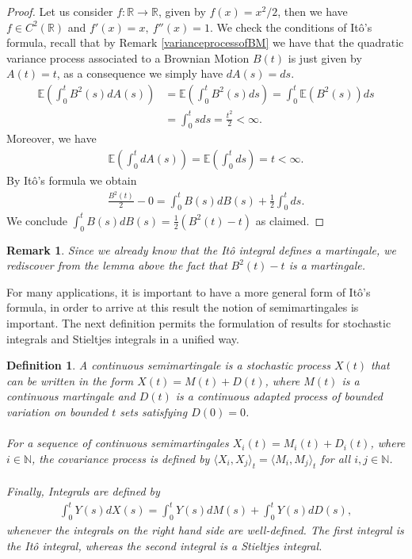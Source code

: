 \documentclass[11pt,a4paper, final]{article}
\newtheorem{defn}{Definition}[section]
\newtheorem{rem}{Remark}[defn]
\begin{document}
\begin{proof}
Let us consider $f: \mathbb{R} \to \mathbb{R}$, given by $f(x) = x^2/2$, then we have $f \in C^2( \mathbb{R})$ and $f'(x)=x, \ f''(x) = 1$. We check the conditions of Itô's formula, recall that by Remark \ref{varianceprocessofBM} we have that the quadratic variance process associated to a Brownian Motion $B(t)$ is just given by $A(t)=t$, as a consequence we simply have $dA(s)=ds$. 
\begin{align*}
\mathbb{E} \left( \int_0^t B^2(s) dA(s) \right) &= \mathbb{E} \left( \int_0^t B^2(s) ds \right) = \int_0^t \mathbb{E}(B^2(s) ) ds \\ &  = \int_0^t s ds = \frac{t^2}{2} < \infty.
\end{align*} 
Moreover, we have
\begin{align*}
\mathbb{E} \left( \int_0^t dA(s) \right) = \mathbb{E}\left( \int_0^t ds \right) = t < \infty. 
\end{align*}
By Itô's formula we obtain
\begin{align*}
\frac{B^2(t)}{2}- 0 = \int_0^t B(s) dB(s) + \frac{1}{2} \int_0^t ds.
\end{align*}
We conclude $\displaystyle \int_0^t B(s) dB(s) = \frac{1}{2}(B^2(t)-t)$ as claimed. 
\end{proof}
\begin{rem} Since we already know that the Itô integral defines a martingale, we rediscover from the lemma above the fact that $B^2(t)-t$ is a martingale. 
\end{rem}
\newpage
\noindent For many applications, it is important to have a more general form of Itô's formula, in order to arrive at this result the notion of semimartingales is important. The next definition permits the formulation of results for stochastic integrals and Stieltjes integrals in a unified way. 
\begin{defn} \label{defsemimartingale} A continuous semimartingale is a stochastic process $X(t)$ that can be written in the form $X(t)=M(t) + D(t)$, where $M(t)$ is a continuous martingale and $D(t)$ is a continuous adapted process of bounded variation on bounded $t$ sets satisfying $D(0)=0$. 
\\\\
For a sequence of continuous semimartingales $X_i(t)= M_i(t) + D_i(t)$, where $i \in \mathbb{N}$, the covariance process is defined by $\langle X_i, X_j \rangle_t = \langle M_i, M_j \rangle_t$ for all $i,j \in \mathbb{N}$. 
\\\\
Finally, Integrals are defined by 
\begin{align*}
\int_0^t Y(s) dX(s) = \int_0^t Y(s) dM(s) + \int_0^t Y(s) dD(s),
\end{align*}
whenever the integrals on the right hand side are well-defined. The first integral is the Itô integral, whereas the second integral is a Stieltjes integral. 
\end{defn}
\end{document}
